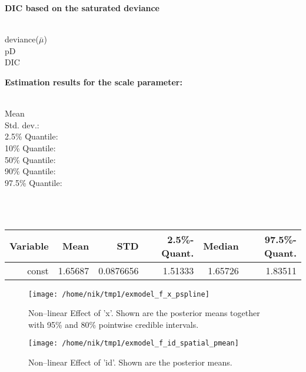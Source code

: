 \documentclass[a4paper, 12pt]{article}
\begin{document}
{\bf DIC based on the saturated deviance } 

\vspace{-0.4cm}
\begin{tabbing}
\hspace{3cm} \= \\
deviance($\bar{\mu}$)  \\
pD  \\
DIC  \\
\end{tabbing}


 {\bf \large Estimation results for the scale parameter: }\\ 

\vspace{-0.4cm}
\begin{tabbing}
\hspace{3cm} \= \\
Mean   \\
Std. dev.:   \\
  2.5\% Quantile:   \\
  10\% Quantile:   \\
  50\% Quantile:   \\
  90\% Quantile:   \\
  97.5\% Quantile:   \\
\end{tabbing}


\newpage 


\\
\\
\begin{tabular}{|r|rrrrr|}
\hline
Variable & Mean & STD & 2.5\%-Quant. & Median & 97.5\%-Quant.\\
\hline
const & 1.65687 & 0.0876656 & 1.51333 & 1.65726 & 1.83511\\
\hline 
\end{tabular}

\newpage
{}

\begin{figure}[h!]
\centering
\texttt{[image: /home/nik/tmp1/exmodel\_f\_x\_pspline]}
\caption{Non--linear Effect of 'x'.
Shown are the posterior means together with 95\% and 80\% pointwise credible intervals.}
\end{figure}

\begin{figure}[h!]
\centering
\texttt{[image: /home/nik/tmp1/exmodel\_f\_id\_spatial\_pmean]}
\caption{Non--linear Effect of 'id'. Shown are the posterior means.}
\end{figure}
\end{document}
